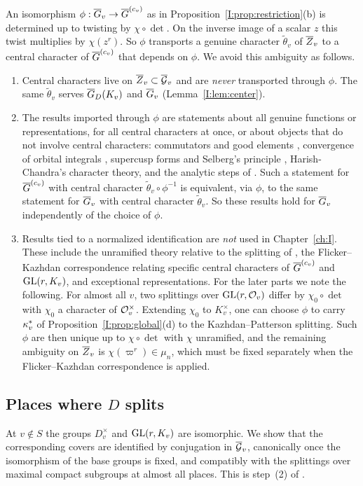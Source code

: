 \begin{remark}\label{I:rem:chidet}
An isomorphism $\phi:\overline{G}_v\to\overline{G}^{(c_v)}$ as in Proposition~\ref{I:prop:restriction}(b) is determined up to twisting by $\chi\circ\det$. On the inverse image of a scalar $z$ this twist multiplies by $\chi(z^r)$. So $\phi$ transports a genuine character $\tilde\theta_v$ of $\overline{Z}_v$ to a central character of $\overline{G}^{(c_v)}$ that depends on $\phi$. We avoid this ambiguity as follows.
\begin{enumerate}[label=(\arabic*)]
\item Central characters live on $\overline{Z}_v\subset\overline{\mathcal{G}}_v$ and are \emph{never} transported through $\phi$. The same $\tilde\theta_v$ serves $\overline{G}_D(K_v)$ and $\overline{G}_v$ (Lemma~\ref{I:lem:center}).
\item The results imported through $\phi$ are statements about all genuine functions or representations, for all central characters at once, or about objects that do not involve central characters: commutators and good elements \cite[\S3]{FK86}, convergence of orbital integrals \cite[\S6]{FK86}, supercusp forms and Selberg's principle \cite[\S13]{FK86}, Harish-Chandra's character theory, and the analytic steps of \cite[\S18]{FK86}. Such a statement for $\overline{G}^{(c_v)}$ with central character $\tilde\theta_v\circ\phi^{-1}$ is equivalent, via $\phi$, to the same statement for $\overline{G}_v$ with central character $\tilde\theta_v$. So these results hold for $\overline{G}_v$ independently of the choice of $\phi$.
\item Results tied to a normalized identification are \emph{not} used in Chapter~\ref{ch:I}. These include the unramified theory relative to the splitting of \cite{KP84}, the Flicker--Kazhdan correspondence relating specific central characters of $\overline{G}^{(c_v)}$ and $\mathrm{GL}(r,K_v)$, and exceptional representations. For the later parts we note the following. For almost all $v$, two splittings over $\mathrm{GL}(r,\mathcal{O}_v)$ differ by $\chi_0\circ\det$ with $\chi_0$ a character of $\mathcal{O}_v^\times$. Extending $\chi_0$ to $K_v^\times$, one can choose $\phi$ to carry $\kappa^{*}_v$ of Proposition~\ref{I:prop:global}(d) to the Kazhdan--Patterson splitting. Such $\phi$ are then unique up to $\chi\circ\det$ with $\chi$ unramified, and the remaining ambiguity on $\overline{Z}_v$ is $\chi(\varpi^r)\in\mu_n$, which must be fixed separately when the Flicker--Kazhdan correspondence is applied.
\end{enumerate}
\end{remark}

\subsection{Places where $D$ splits}\label{I:subsec:outsideS}
At $v\notin S$ the groups $D_v^\times$ and $\mathrm{GL}(r,K_v)$ are isomorphic. We show that the corresponding covers are identified by conjugation in $\overline{\mathcal{G}}_v$, canonically once the isomorphism of the base groups is fixed, and compatibly with the splittings over maximal compact subgroups at almost all places. This is step~(2) of \cite[Remark~10.3]{JC26a}.


